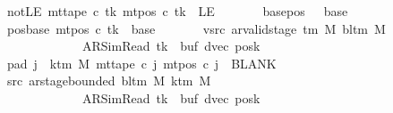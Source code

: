 \begin{isabellebody}
\ \ \ \ \ \ \ notLE{\isacharcolon}{\kern0pt}\ {\isachardoublequoteopen}mt{\isacharunderscore}{\kern0pt}tape\ c{\isacharprime}{\kern0pt}\ tk\ {\isacharparenleft}{\kern0pt}mt{\isacharunderscore}{\kern0pt}pos\ c{\isacharprime}{\kern0pt}\ tk{\isacharparenright}{\kern0pt}\ {\isasymnoteq}\ LE{}{\isachardoublequoteclose}\isanewline
\ \ \ \ \ \ \ base{\isacharunderscore}{\kern0pt}pos{\isacharcolon}{\kern0pt}\ {\isachardoublequoteopen}{}\ {\isacharless}{\kern0pt}\ base{\isachardoublequoteclose}\isanewline
\ \ \ \ \ \ \ pos{\isacharunderscore}{\kern0pt}base{\isacharcolon}{\kern0pt}\ {\isachardoublequoteopen}mt{\isacharunderscore}{\kern0pt}pos\ c{\isacharprime}{\kern0pt}\ tk\ {\isacharequal}{\kern0pt}\ base{\isachardoublequoteclose}\isanewline
\ \ \ \ \ \ \ vsrc{\isacharcolon}{\kern0pt}\ {\isachardoublequoteopen}ar{\isacharunderscore}{\kern0pt}valid{\isacharunderscore}{\kern0pt}stage\ {\isacharparenleft}{\kern0pt}{\isasymGamma}{\isacharunderscore}{\kern0pt}tm\ M{\isacharparenright}{\kern0pt}\ {\isacharparenleft}{\kern0pt}bl{\isacharunderscore}{\kern0pt}tm\ M{\isacharparenright}{\kern0pt}\isanewline
\ \ \ \ \ \ \ \ \ \ \ \ \ \ \ \ \ \ \ {\isacharparenleft}{\kern0pt}AR{\isacharunderscore}{\kern0pt}SimRead{\isacharcomma}{\kern0pt}\ tk{\isacharcomma}{\kern0pt}\ {}{\isacharcomma}{\kern0pt}\ buf{\isacharcomma}{\kern0pt}\ dvec{\isacharcomma}{\kern0pt}\ posk{\isacharparenright}{\kern0pt}{\isachardoublequoteclose}\isanewline
\ \ \ \ \ \ \ pad{}{\isacharcolon}{\kern0pt}\ {\isachardoublequoteopen}{\isasymforall}j\ {\isasymge}\ k{\isacharunderscore}{\kern0pt}tm\ M{\isachardot}{\kern0pt}\ mt{\isacharunderscore}{\kern0pt}tape\ c{\isacharprime}{\kern0pt}\ j\ {\isacharparenleft}{\kern0pt}mt{\isacharunderscore}{\kern0pt}pos\ c{\isacharprime}{\kern0pt}\ j{\isacharparenright}{\kern0pt}\ {\isacharequal}{\kern0pt}\ BLANK{}{\isachardoublequoteclose}\isanewline
\ \ \ \ \ \ \ src{}{\isacharcolon}{\kern0pt}\ {\isachardoublequoteopen}ar{\isacharunderscore}{\kern0pt}stage{\isacharunderscore}{\kern0pt}bounded\ {\isacharparenleft}{\kern0pt}bl{\isacharunderscore}{\kern0pt}tm\ M{\isacharparenright}{\kern0pt}\ {\isacharparenleft}{\kern0pt}k{\isacharunderscore}{\kern0pt}tm\ M{\isacharparenright}{\kern0pt}\isanewline
\ \ \ \ \ \ \ \ \ \ \ \ \ \ \ \ \ \ \ {\isacharparenleft}{\kern0pt}AR{\isacharunderscore}{\kern0pt}SimRead{\isacharcomma}{\kern0pt}\ tk{\isacharcomma}{\kern0pt}\ {}{\isacharcomma}{\kern0pt}\ buf{\isacharcomma}{\kern0pt}\ dvec{\isacharcomma}{\kern0pt}\ posk{\isacharparenright}{\kern0pt}{\isachardoublequoteclose}\isanewline

\end{isabellebody}
